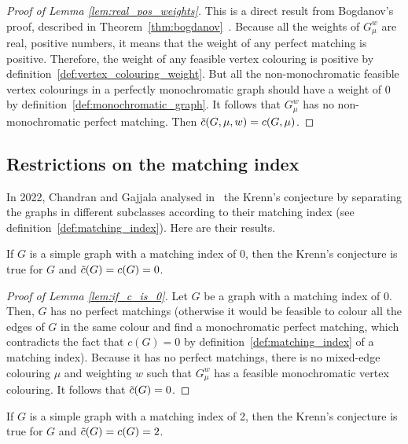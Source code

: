 \begin{proof}[Proof of Lemma \ref{lem:real_pos_weights}]
    This is a direct result from Bogdanov's proof, described in Theorem~\ref{thm:bogdanov}~\cite{bogdanov}.
    Because all the weights of $G_\mu^w$ are real, positive numbers, it means that the weight of any perfect matching is positive.
    Therefore, the weight of any feasible vertex colouring is positive by definition~\ref{def:vertex_colouring_weight}.
    But all the non-monochromatic feasible vertex colourings in a perfectly monochromatic graph should have a weight of 0 by definition~\ref{def:monochromatic_graph}.
    It follows that $G_\mu^w$ has no non-monochromatic perfect matching.
    Then $\Tilde{c}(G, \mu, w) = c(G, \mu)$.
\end{proof}


\subsection{Restrictions on the matching index}
\label{subsec:proved-special-cases-matching-index}

In 2022, Chandran and Gajjala analysed in~\cite{chandran} the Krenn's conjecture by separating the graphs in different subclasses according to their matching index (see definition~\ref{def:matching_index}).
Here are their results.

\begin{lemma}
    \label{lem:if_c_is_0}
    If $G$ is a simple graph with a matching index of 0, then the Krenn's conjecture is true for $G$ and $\Tilde{c}(G) = c(G) = 0$.
\end{lemma}

\begin{proof}[Proof of Lemma \ref{lem:if_c_is_0}]
    Let $G$ be a graph with a matching index of 0.
    Then, $G$ has no perfect matchings (otherwise it would be feasible to colour all the edges of $G$ in the same colour and find a monochromatic perfect matching, which contradicts the fact that $c(G) = 0$ by definition~\ref{def:matching_index} of a matching index).
    Because it has no perfect matchings, there is no mixed-edge colouring $\mu$ and weighting $w$ such that $G_\mu^w$ has a feasible monochromatic vertex colouring.
    It follows that $\Tilde{c}(G) = 0$.
\end{proof}

\begin{lemma}
    \label{lem:if_c_is_2}
    If $G$ is a simple graph with a matching index of 2, then the Krenn's conjecture is true for $G$ and $\Tilde{c}(G) = c(G) = 2$.
\end{lemma}

